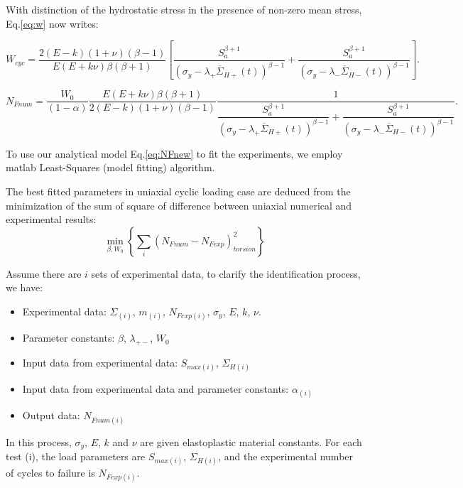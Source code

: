 \documentclass[3p,times,number,review]{elsarticle}
\begin{document}
With distinction of the hydrostatic stress in the presence of non-zero mean stress, Eq.\eqref{eq:w} now writes:

\begin{equation}
W_{cyc}=\dfrac{2(E-k)(1+\nu)\left( \beta-1\right) }{ E(E+k\nu)\beta\left( \beta+1\right) }\left[ \dfrac{S_{a}^{\beta+1}}{ \left(\sigma_y-\lambda_+ \overline{\Sigma}_{H+}(t)\right)^{\beta-1}}+\dfrac{S_{a}^{\beta+1}}{ \left(\sigma_y-\lambda_- \overline{\Sigma}_{H-}(t)\right)^{\beta-1}}\right] .
\label{eq:wcycnew}
\end{equation}

\begin{equation}N_{Fnum}=\dfrac{W_0}{\left( 1-\alpha\right) }\dfrac{E(E+k\nu)\beta\left( \beta+1\right) }{ 2(E-k)(1+\nu)\left( \beta-1\right) }\dfrac{1}{\dfrac{S_{a}^{\beta+1}}{\left(\sigma_y-\lambda_+\overline{\Sigma}_{H+}(t)\right)^{\beta-1}}+\dfrac{S_{a}^{\beta+1}}{\left(\sigma_y-\lambda_-\overline{\Sigma}_{H-}(t)\right)^{\beta-1}}}.\label{eq:NFnew}
\end{equation}


To use our analytical model Eq.\eqref{eq:NFnew} to fit the experiments, we employ matlab Least-Squares (model fitting) algorithm. 

The best fitted parameters in uniaxial cyclic loading case are deduced from the minimization of the sum of square of difference between uniaxial numerical and experimental results:
\begin{equation}
\min_{\beta,W_0}\left\lbrace \sum_{i}\left(N_{Fnum}-N_{Fexp} \right)_{torsion}^2\right\rbrace 
\label{eq.leastsquares}
\end{equation}

Assume there are $i$ sets of experimental data, to clarify the identification process, we have:
\begin{itemize}
	\item Experimental data: $\Sigma_{(i)}$, $m_{(i)}$, $N_{Fexp(i)}$, $\sigma_y$, $E$, $k$, $\nu$.
	\item Parameter constants: $\beta$, $\lambda_{+-}$, $W_0$
	\item Input data from experimental data: $S_{max(i)}$, $\Sigma_{H(i)}$
	\item Input data from experimental data and parameter constants: $\alpha_{(i)}$
	\item Output data: $N_{Fnum(i)}$
\end{itemize}

In this process, $\sigma_y$, $E$, $k$ and $\nu$ are given elastoplastic material constants. For each test (i), the load parameters are $S_{max(i)}$, $\Sigma_{H(i)}$, and the experimental number of cycles to failure is $N_{Fexp(i)}$.
\end{document}
